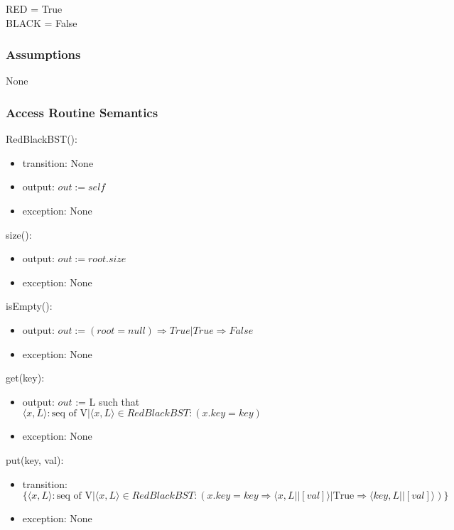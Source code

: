 \documentclass[12pt]{article}
\begin{document}
RED = True\\
BLACK = False

\subsubsection* {Assumptions}

None

\subsubsection* {Access Routine Semantics}

RedBlackBST():
\begin{itemize}
\item transition: None
\item output: $out := \mathit{self}$
\item exception: None
\end{itemize}

\noindent size():
\begin{itemize}
\item output: $out := root.size$
\item exception: None
\end{itemize}

\noindent isEmpty():
\begin{itemize}
\item output: $out := (root = null) \Rightarrow True | True \Rightarrow False$
\item exception: None
\end{itemize}

\noindent get(key):
\begin{itemize}
\item output: $out$ := L such that $ \langle x, L \rangle : \text{seq of V} |
  \langle x, L \rangle \in RedBlackBST : (x.key = \mathit{key})$
\item exception: None
\end{itemize}

\noindent put(key, val):
\begin{itemize}
\item transition: $\{ \langle x, L \rangle : \text{seq of V} |
  \langle x, L \rangle \in RedBlackBST : (x.key = \mathit{key} \Rightarrow \langle x, L || [val] \rangle
   | \text{True} \Rightarrow \langle key, L || [val] \rangle) \}$

\item exception: None
\end{itemize}
\end{document}
